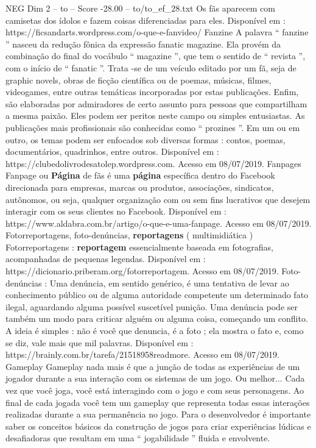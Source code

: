 \begin{textsample}{NEG Dim 2 – to – Score -28.00 – to/to\_ef\_28.txt}
Os fãs aparecem com camisetas dos ídolos e fazem coisas diferenciadas para eles.
Disponível em : https://ficsandarts.wordpress.com/o-que-e-fanvideo/ Fanzine A palavra “ fanzine ” nasceu da redução fônica da expressão fanatic magazine.
Ela provém da combinação do final do vocábulo “ magazine ”, que tem o sentido de “ revista ”, com o início de “ fanatic ”.
Trata -se de um veículo editado por um fã, seja de graphic novels, obras de ficção científica ou de poemas, músicas, filmes, videogames, entre outras temáticas incorporadas por estas publicações.
Enfim, são elaboradas por admiradores de certo assunto para pessoas que compartilham a mesma paixão.
Eles podem ser peritos neste campo ou simples entusiastas.
As publicações mais profissionais são conhecidas como “ prozines ”.
Em um ou em outro, os temas podem ser enfocados sob diversas formas : contos, poemas, documentários, quadrinhos, entre outros.
Disponível em : https://clubedolivrodesatolep.wordpress.com.
Acesso em 08/07/2019.
Fanpages Fanpage ou \textbf{Página} de fãs é uma \textbf{página} específica dentro do Facebook direcionada para empresas, marcas ou produtos, associações, sindicatos, autônomos, ou seja, qualquer organização com ou sem fins lucrativos que desejem interagir com os seus clientes no Facebook.
Disponível em : https://www.aldabra.com.br/artigo/o-que-e-uma-fanpage.
Acesso em 08/07/2019.
Fotorreportagens, foto-denúncias, \textbf{reportagens} ( multimidiática ) Fotorreportagens : \textbf{reportagem} essencialmente baseada em fotografias, acompanhadas de pequenas legendas.
Disponível em : https://dicionario.priberam.org/fotorreportagem.
Acesso em 08/07/2019.
Foto-denúncias : Uma denúncia, em sentido genérico, é uma tentativa de levar ao conhecimento público ou de alguma autoridade competente um determinado fato ilegal, aguardando alguma possível suscetível punição.
Uma denúncia pode ser também um modo para criticar alguém ou alguma coisa, começando um conflito.
A ideia é simples : não é você que denuncia, é a foto ; ela mostra o fato e, como se diz, vale mais que mil palavras.
Disponível em : https://brainly.com.br/tarefa/21518958readmore.
Acesso em 08/07/2019.
Gameplay Gameplay nada mais é que a junção de todas as experiências de um jogador durante a sua interação com os sistemas de um jogo.
Ou melhor...
Cada vez que você joga, você está interagindo com o jogo e com seus personagens.
Ao final de cada jogada você tem um gameplay que representa todas essas interações realizadas durante a sua permanência no jogo.
Para o desenvolvedor é importante saber os conceitos básicos da construção de jogos para criar experiências lúdicas e desafiadoras que resultam em uma “ jogabilidade ” fluida e envolvente.

\end{textsample}
